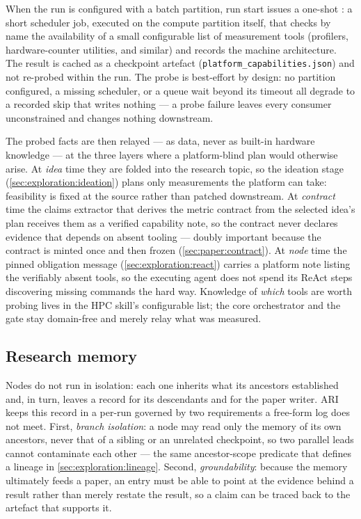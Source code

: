 When the run is configured with a batch partition, run start issues a
one-shot : a short scheduler job, executed on
the compute partition itself, that checks by name the availability of
a small configurable list of measurement tools (profilers,
hardware-counter utilities, and similar) and records the machine
architecture. The result is cached as a checkpoint artefact
(\texttt{platform\_capabilities.json}) and not re-probed within the
run. The probe is best-effort by design: no partition configured, a
missing scheduler, or a queue wait beyond its timeout all degrade to
a recorded skip that writes nothing --- a probe failure leaves every
consumer unconstrained and changes nothing downstream.

The probed facts are then relayed --- as data, never as built-in
hardware knowledge --- at the three layers where a platform-blind
plan would otherwise arise. At \emph{idea} time they are folded into
the research topic, so the ideation stage
(\cref{sec:exploration:ideation}) plans only measurements the
platform can take: feasibility is fixed at the source rather than
patched downstream. At \emph{contract} time the claims extractor that
derives the metric contract from the selected idea's plan receives
them as a verified capability note, so the contract never declares
evidence that depends on absent tooling --- doubly important because
the contract is minted once and then frozen
(\cref{sec:paper:contract}). At \emph{node} time the pinned
obligation message (\cref{sec:exploration:react}) carries a platform
note listing the verifiably absent tools, so the executing agent does
not spend its ReAct steps discovering missing commands the hard way.
Knowledge of \emph{which} tools are worth probing lives in the HPC
skill's configurable list; the core orchestrator and the gate stay
domain-free and merely relay what was measured.

\subsection{Research memory}\label{sec:exploration:memory}

Nodes do not run in isolation: each one inherits what its ancestors
established and, in turn, leaves a record for its descendants and for the
paper writer. ARI keeps this record in a per-run 
governed by two requirements a free-form log does not meet. First,
\emph{branch isolation}: a node may read only the memory of its own
ancestors, never that of a sibling or an unrelated checkpoint, so two
parallel leads cannot contaminate each other --- the same ancestor-scope
predicate that defines a lineage in \cref{sec:exploration:lineage}.
Second, \emph{groundability}: because the memory ultimately feeds a
paper, an entry must be able to point at the evidence behind a result
rather than merely restate the result, so a claim can be traced back to
the artefact that supports it.

